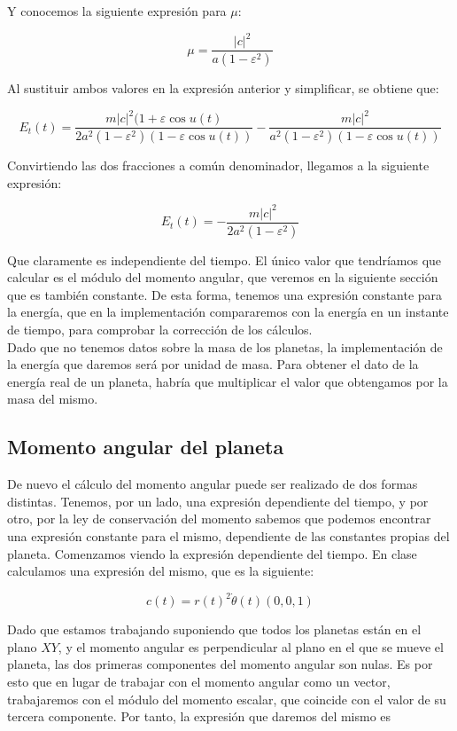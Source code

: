 \documentclass[12pt]{article}
\begin{document}
Y conocemos la siguiente expresión para $\mu$:

\[
\mu = \frac{|c|^2}{a(1 - \varepsilon^2)}
\]

Al sustituir ambos valores en la expresión anterior y simplificar, se
obtiene que:

\[
E_t(t) = \frac{m|c|^2(1+\varepsilon
  \cos{u(t)}}{2a^2(1-\varepsilon^2)(1-\varepsilon \cos{u(t)})} -
\frac{m|c|^2}{a^2(1 - \varepsilon^2)(1-\varepsilon \cos{u(t)})}
\]

Convirtiendo las dos fracciones a común denominador, llegamos a la
siguiente expresión:

\[
E_t(t) = -\frac{m|c|^2}{2a^2(1-\varepsilon^2)}
\]

Que claramente es independiente del tiempo. El único valor que
tendríamos que calcular es el módulo del momento angular, que veremos
en la siguiente sección que es también constante. De esta forma,
tenemos una expresión constante para la energía, que en la
implementación compararemos con la energía en un instante de
tiempo, para comprobar la corrección de los cálculos.\\

Dado que no tenemos datos sobre la masa de los planetas, la
implementación de la energía que daremos será por unidad de masa. Para 
obtener el dato de la energía real de un planeta, habría que multiplicar
el valor que obtengamos por la masa del mismo.

\subsection{Momento angular del planeta}

De nuevo el cálculo del momento angular puede ser realizado de dos
formas distintas. Tenemos, por un lado, una expresión dependiente del
tiempo, y por otro, por la ley de conservación del momento sabemos que
podemos encontrar una expresión constante para el mismo, dependiente
de las constantes propias del planeta. Comenzamos viendo la expresión
dependiente del tiempo. En clase calculamos una expresión del mismo,
que es la siguiente:

\[
c(t) = r(t)^2\dot{\theta}(t)(0,0,1)
\]

Dado que estamos trabajando suponiendo que todos los planetas están en
el plano $XY$, y el momento angular es perpendicular al plano en el
que se mueve el planeta, las dos primeras componentes del momento
angular son nulas. Es por esto que en lugar de trabajar con el momento
angular como un vector, trabajaremos con el módulo del momento
escalar, que coincide con el valor de su tercera componente. Por
tanto, la expresión que daremos del mismo es
\end{document}
